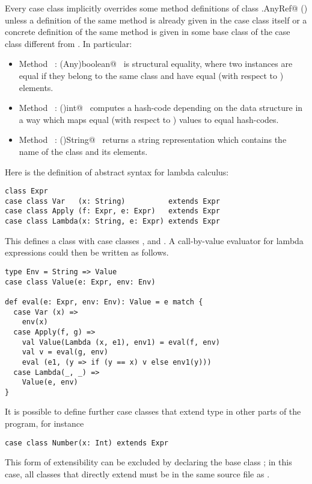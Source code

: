 Every case class implicitly overrides some method definitions of class
\lstinline@scala.AnyRef@ () unless a definition of the same
method is already given in the case class itself or a concrete
definition of the same method is given in some base class of the case
class different from . In particular:
\begin{itemize}
\item[] Method ~\lstinline@equals: (Any)boolean@~ is structural equality, where two
instances are equal if they belong to the same class and
have equal (with respect to ) elements.
\item[] Method ~\lstinline@hashCode: ()int@~ computes a hash-code
depending on the data structure in a way which maps equal (with respect to
) values to equal hash-codes.
\item[] Method ~\lstinline@toString: ()String@~ returns a string representation which
contains the name of the class and its elements.
\end{itemize}

\example Here is the definition of abstract syntax for lambda
calculus:

\begin{lstlisting}
class Expr 
case class Var   (x: String)          extends Expr
case class Apply (f: Expr, e: Expr)   extends Expr
case class Lambda(x: String, e: Expr) extends Expr 
\end{lstlisting}
This defines a class  with case classes
,  and . A call-by-value evaluator for lambda
expressions could then be written as follows.

\begin{lstlisting}
type Env = String => Value 
case class Value(e: Expr, env: Env) 

def eval(e: Expr, env: Env): Value = e match {
  case Var (x) =>
    env(x)
  case Apply(f, g) =>
    val Value(Lambda (x, e1), env1) = eval(f, env) 
    val v = eval(g, env) 
    eval (e1, (y => if (y == x) v else env1(y)))
  case Lambda(_, _) =>
    Value(e, env)
}
\end{lstlisting}

It is possible to define further case classes that extend type
 in other parts of the program, for instance
\begin{lstlisting}
case class Number(x: Int) extends Expr 
\end{lstlisting}

This form of extensibility can be excluded by declaring the base class
 ; in this case, all classes that
directly extend  must be in the same source file as
.

